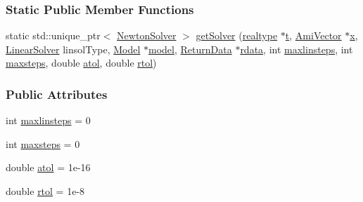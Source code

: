\subsubsection*{Static Public Member Functions}
\begin{DoxyCompactItemize}
\item 
static std\+::unique\+\_\+ptr$<$ \mbox{\hyperlink{classamici_1_1_newton_solver}{Newton\+Solver}} $>$ \mbox{\hyperlink{classamici_1_1_newton_solver_a4d1ae8a0dc599423ef6538ca406ab67e}{get\+Solver}} (\mbox{\hyperlink{namespaceamici_a1bdce28051d6a53868f7ccbf5f2c14a3}{realtype}} $\ast$\mbox{\hyperlink{classamici_1_1_newton_solver_ad94d61da9b85c1a151ffd8e228758c7c}{t}}, \mbox{\hyperlink{classamici_1_1_ami_vector}{Ami\+Vector}} $\ast$\mbox{\hyperlink{classamici_1_1_newton_solver_af64268982dd7b9be1690573763982e0b}{x}}, \mbox{\hyperlink{namespaceamici_a1a6a4776314a0843143e5631c3ce21a7}{Linear\+Solver}} linsol\+Type, \mbox{\hyperlink{classamici_1_1_model}{Model}} $\ast$\mbox{\hyperlink{classamici_1_1_newton_solver_a7b56c3ca57dde73bdbc8dbe9772bca19}{model}}, \mbox{\hyperlink{classamici_1_1_return_data}{Return\+Data}} $\ast$\mbox{\hyperlink{classamici_1_1_newton_solver_a4c0807651f0594a186e8856f22e442cc}{rdata}}, int \mbox{\hyperlink{classamici_1_1_newton_solver_a60fddefccade5b1c083c6803c4c49707}{maxlinsteps}}, int \mbox{\hyperlink{classamici_1_1_newton_solver_a029415ebe024ac6281fd9f190aefb2ee}{maxsteps}}, double \mbox{\hyperlink{classamici_1_1_newton_solver_a60c6dfc476dd9596072f61c2ec8d58ed}{atol}}, double \mbox{\hyperlink{classamici_1_1_newton_solver_a4587afeee8941ba7c208b3690a3eeaa7}{rtol}})
\end{DoxyCompactItemize}
\subsubsection*{Public Attributes}
\begin{DoxyCompactItemize}
\item 
int \mbox{\hyperlink{classamici_1_1_newton_solver_a60fddefccade5b1c083c6803c4c49707}{maxlinsteps}} = 0
\item 
int \mbox{\hyperlink{classamici_1_1_newton_solver_a029415ebe024ac6281fd9f190aefb2ee}{maxsteps}} = 0
\item 
double \mbox{\hyperlink{classamici_1_1_newton_solver_a60c6dfc476dd9596072f61c2ec8d58ed}{atol}} = 1e-\/16
\item 
double \mbox{\hyperlink{classamici_1_1_newton_solver_a4587afeee8941ba7c208b3690a3eeaa7}{rtol}} = 1e-\/8
\end{DoxyCompactItemize}
